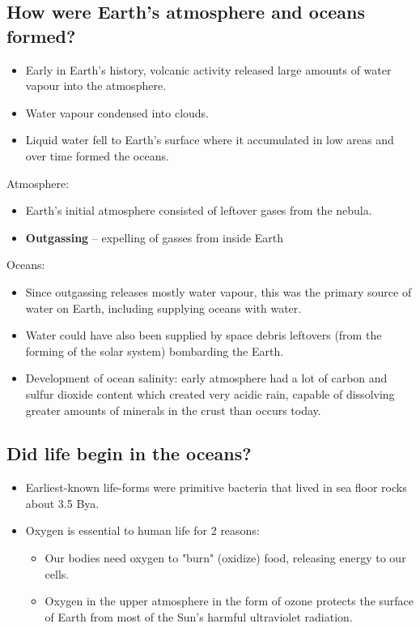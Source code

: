 \subsection{How were Earth's atmosphere and oceans formed?}
\begin{itemize}
	\item Early in Earth's history, volcanic activity released large
		amounts of water vapour into the atmosphere.
	\item Water vapour condensed into clouds.
	\item Liquid water fell to Earth's surface where it accumulated in
		low areas and over time formed the oceans.
\end{itemize}

Atmosphere:

\begin{itemize}
	\item Earth's initial atmosphere consisted of leftover gases from the
		nebula.
	\item \textbf{Outgassing} -- expelling of gasses from inside Earth
\end{itemize}

Oceans:
\begin{itemize}
	\item Since outgassing releases mostly water vapour, this was the
		primary source of water on Earth, including supplying oceans
		with water.
	\item Water could have also been supplied by space debris leftovers
		(from the forming of the solar system) bombarding the Earth.
	\item Development of ocean salinity: early atmosphere had a lot of
		carbon and sulfur dioxide content which created very acidic
		rain, capable of dissolving greater amounts of minerals in the
		crust than occurs today.
\end{itemize}

\subsection{Did life begin in the oceans?}

\begin{itemize}
	\item Earliest-known life-forms were primitive bacteria that lived in
		sea floor rocks about 3.5 Bya.
	\item Oxygen is essential to human life for 2 reasons:
		\begin{itemize}
			\item Our bodies need oxygen to "burn" (oxidize)
				food, releasing energy to our cells.
			\item Oxygen in the upper atmosphere in the form of
				ozone protects the surface of Earth from most
				of the Sun's harmful ultraviolet radiation.
		\end{itemize}
\end{itemize}

